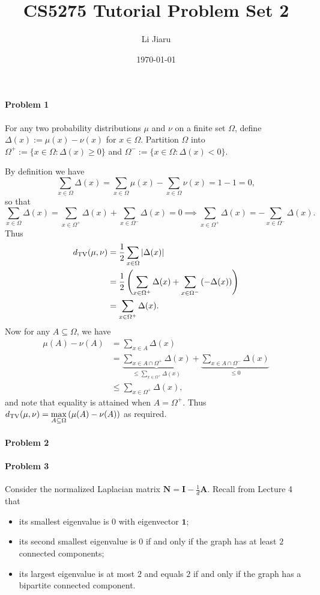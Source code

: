 \documentclass[12pt]{article}
\title{CS5275 Tutorial Problem Set 2}
\author{Li Jiaru}
\date{\today}
\DeclareMathOperator{\dTV}{\mathnormal{d}_{\mathrm{TV}}}
\begin{document}
\maketitle
\paragraph{Problem 1}
For any two probability distributions $\mu$ and $\nu$ on a finite set $\Omega$, define $\Delta(x):=\mu(x)-\nu(x)$ for $x\in\Omega$. Partition $\Omega$ into $\Omega^+:=\{x\in\Omega:\Delta(x)\ge0\}$ and $\Omega^-:=\{x\in\Omega:\Delta(x)<0\}$.

By definition we have $$\sum_{x\in\Omega}\Delta(x)=\sum_{x\in\Omega}\mu(x)-\sum_{x\in\Omega}\nu(x)=1-1=0,$$
so that $$\sum_{x\in\Omega}\Delta(x)=\sum_{x\in\Omega^+}\Delta(x)+\sum_{x\in\Omega^-}\Delta(x)=0\implies\sum_{x\in\Omega^+}\Delta(x)=-\sum_{x\in\Omega^-}\Delta(x).$$
Thus \begin{align*}
\dTV(\mu,\nu)&=\frac1 2\sum_{x\in\Omega}|\Delta(x)|\\
&=\frac1 2\left(\sum_{x\in\Omega^+}\Delta(x)+\sum_{x\in\Omega^-}\left(-\Delta(x)\right)\right)\\
&=\sum_{x\in\Omega^+}\Delta(x).
\end{align*}
Now for any $A\subseteq\Omega$, we have
\begin{align*}
\mu(A)-\nu(A)&=\sum_{x\in A}\Delta(x)\\
&=\underbrace{\sum_{x\in A\cap\Omega^+}\Delta(x)}_{\le\sum_{x\in\Omega^+}\Delta(x)}+\underbrace{\sum_{x\in A\cap\Omega^-}\Delta(x)}_{\le0}\\
&\le\sum_{x\in\Omega^+}\Delta(x),
\end{align*}
and note that equality is attained when $A=\Omega^+$. Thus $\displaystyle\dTV(\mu,\nu)=\max_{A\subseteq\Omega}\left(\mu(A)-\nu(A)\right)$ as required.
\paragraph{Problem 2}
\paragraph{Problem 3}
Consider the normalized Laplacian matrix $\mathbf{N}=\mathbf{I}-\frac 1 d\mathbf{A}$. Recall from Lecture 4 that\begin{itemize}
\item its smallest eigenvalue is $0$ with eigenvector $\mathbf{1}$; \item its second smallest eigenvalue is $0$ if and only if the graph has at least $2$ connected components; \item its largest eigenvalue is at most $2$ and equals $2$ if and only if the graph has a bipartite connected component.
\end{itemize}
\end{document}
